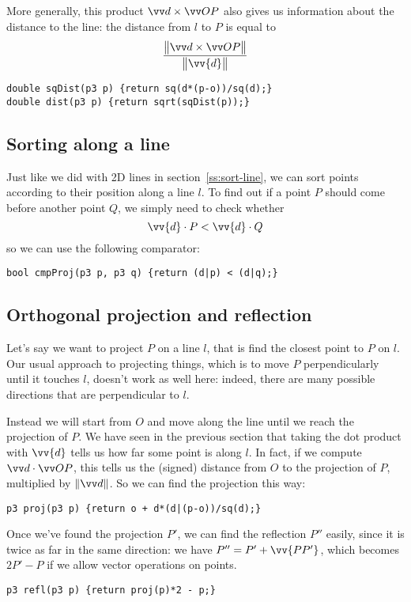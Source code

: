 
More generally, this product $\crossv{d}{OP}$ also gives us information about the distance to the line: the distance from $l$ to $P$ is equal to
\[\frac{\big\|\crossv{d}{OP}\big\|}{\big\|\vv{d}\big\|}\]
\begin{lstlisting}
double sqDist(p3 p) {return sq(d*(p-o))/sq(d);}
double dist(p3 p) {return sqrt(sqDist(p));}
\end{lstlisting}

\subsection{Sorting along a line}\label{ss:sort-line3d}
Just like we did with 2D lines in section~\ref{ss:sort-line}, we can sort points according to their position along a line $l$. To find out if a point $P$ should come before another point $Q$, we simply need to check whether
\[\vv{d}\cdot P < \vv{d}\cdot Q\]
so we can use the following comparator:
\begin{lstlisting}
bool cmpProj(p3 p, p3 q) {return (d|p) < (d|q);}
\end{lstlisting}

\subsection{Orthogonal projection and reflection}
Let's say we want to project $P$ on a line $l$, that is find the closest point to $P$ on $l$.
Our usual approach to projecting things, which is to move $P$ perpendicularly until it touches $l$, doesn't work as well here: indeed, there are many possible directions that are perpendicular to $l$.


Instead we will start from $O$ and move along the line until we reach the projection of $P$. We have seen in the previous section that taking the dot product with $\vv{d}$ tells us how far some point is along $l$. In fact, if we compute $\dotv{d}{OP}$, this tells us the (signed) distance from $O$ to the projection of $P$, multiplied by $\normv{d}$. So we can find the projection this way:
\begin{lstlisting}
p3 proj(p3 p) {return o + d*(d|(p-o))/sq(d);}
\end{lstlisting}

Once we've found the projection $P'$, we can find the reflection $P''$ easily, since it is twice as far in the same direction: we have $P'' = P' + \vv{PP'}$, which becomes $2P'-P$ if we allow vector operations on points.
\begin{lstlisting}
p3 refl(p3 p) {return proj(p)*2 - p;}
\end{lstlisting}

